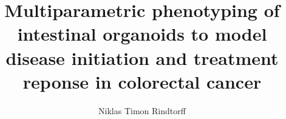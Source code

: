\title{Multiparametric phenotyping of intestinal organoids to model disease initiation and treatment reponse in colorectal cancer}
\author{Niklas Timon Rindtorff}

\degree{} %
\field{} %

